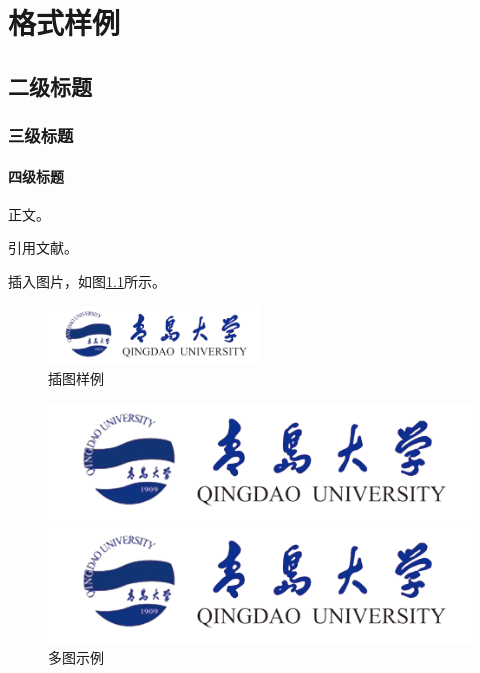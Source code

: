 \chapter{格式样例}
\section{二级标题}
\subsection{三级标题}
\subsubsection{四级标题}
正文。

引用文献\cite{刘海洋2013LATEX}。

插入图片，如图\ref{fig:sample_figure}所示。\par
\begin{figure}[htb]
\centering
\includegraphics[width=0.5\textwidth]{figures/logo.png}
\caption{插图样例}
\label{fig:sample_figure}
\end{figure}
\begin{figure}[htbp]
	\centering
	\begin{minipage}[t]{0.35 \linewidth}
		\centering
		\includegraphics[width=\textwidth]{figures/logo.png}
	\end{minipage}
	\begin{minipage}[t]{0.35 \linewidth}
		\centering
	\includegraphics[width= \textwidth]{figures/logo.png}
	\caption{多图示例}
	\label{multifig}
\end{minipage}
\end{figure}
